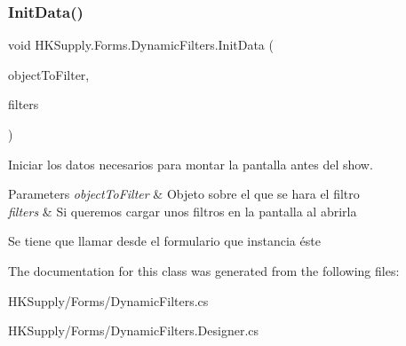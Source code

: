 \subsubsection{\texorpdfstring{Init\+Data()}{InitData()}}
{\footnotesize\ttfamily void H\+K\+Supply.\+Forms.\+Dynamic\+Filters.\+Init\+Data (\begin{DoxyParamCaption}\item[{object}]{object\+To\+Filter,  }\item[{List$<$ \hyperlink{class_h_k_supply_1_1_forms_1_1_model_linq_filtering}{Model\+Linq\+Filtering} $>$}]{filters }\end{DoxyParamCaption})}



Iniciar los datos necesarios para montar la pantalla antes del show. 


\begin{DoxyParams}{Parameters}
{\em object\+To\+Filter} & Objeto sobre el que se hara el filtro\\
\hline
{\em filters} & Si queremos cargar unos filtros en la pantalla al abrirla\\
\hline
\end{DoxyParams}


Se tiene que llamar desde el formulario que instancia éste

The documentation for this class was generated from the following files\+:\begin{DoxyCompactItemize}
\item 
H\+K\+Supply/\+Forms/Dynamic\+Filters.\+cs\item 
H\+K\+Supply/\+Forms/Dynamic\+Filters.\+Designer.\+cs\end{DoxyCompactItemize}
